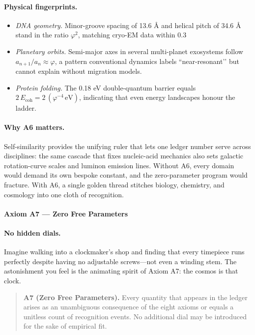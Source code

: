 \documentclass[11pt,oneside]{book}
\newcommand{\Eoh}{\ensuremath{E_{\text{coh}}}}       %
\begin{document}
\paragraph*{Physical fingerprints.}
\begin{itemize}
\item \emph{DNA geometry.}  
  Minor-groove spacing of 13.6 Å and helical pitch of 34.6 Å stand in the
  ratio \(\varphi^2\), matching cryo-EM data within 0.3 %
\item \emph{Planetary orbits.}  
  Semi-major axes in several multi-planet exosystems follow
  \(a_{n+1}/a_n \approx \varphi\), a pattern conventional dynamics labels
  “near-resonant’’ but cannot explain without migration models.
\item \emph{Protein folding.}  
  The 0.18 eV double-quantum barrier equals
  \(2\,\Eoh = 2\,(\varphi^{-4}\,\text{eV})\),  
  indicating that even energy landscapes honour the ladder.
\end{itemize}

\paragraph*{Why A6 matters.}
Self-similarity provides the unifying ruler that lets one ledger number
serve across disciplines: the same cascade that fixes nucleic-acid
mechanics also sets galactic rotation-curve scales and luminon emission
lines.  Without A6, every domain would demand its own bespoke constant,
and the zero-parameter program would fracture.  With A6, a single golden
thread stitches biology, chemistry, and cosmology into one cloth of
recognition.

\bigskip

\paragraph{Axiom A7 — Zero Free Parameters}
\label{ssec:axiom-A7}

\paragraph*{No hidden dials.}
Imagine walking into a clockmaker’s shop and finding that every timepiece
runs perfectly despite having no adjustable screws—not even a winding
stem.  
The astonishment you feel is the animating spirit of Axiom A7:
the cosmos is that clock.

\begin{quote}
\textbf{A7 (Zero Free Parameters).}  
Every quantity that appears in the ledger arises as an unambiguous
consequence of the eight axioms or equals a unitless count of
recognition events.  
No additional dial may be introduced for the sake of empirical fit.
\end{quote}
\end{document}
